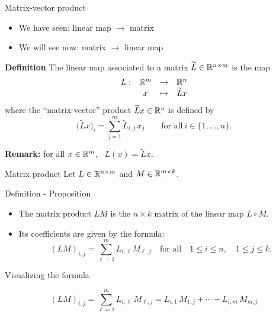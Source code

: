 \documentclass{beamer}
\begin{document}
\begin{frame}[t]{Matrix-vector product}
	\begin{itemize}
		\item We have seen: \quad linear map $\to$ matrix
		\item We will see now: \quad matrix $\to$ linear map
	\end{itemize}

	\begin{block}{\bf Definition}
		The linear map associated to a matrix $\widetilde{L} \in \mathbb{R}^{n \times m}$ is the map
		$$
		\begin{array}{cccc}
			L:& \mathbb{R}^m & \to & \mathbb{R}^n \\
			  & x & \mapsto & \widetilde{L}x
		\end{array}
		$$
		where the ``matrix-vector'' product $\widetilde{L}x \in \mathbb{R}^n$ is defined by
		$$
		\big(\widetilde{L}x\big)_i = \sum_{j=1}^m \widetilde{L}_{i,j} \, x_j \qquad \text{for all} \ i \in \{1, \dots, n\}.
		$$
		\vspace{-0.5cm}
	\end{block}
	\vspace{0.2cm}
	\textbf{Remark:} for all $x\in\mathbb{R}^m$, \ $L(x) = \widetilde{L}x$.
\end{frame}

\begin{frame}[t]{Matrix product}
	Let $L \in \mathbb{R}^{n \times m}$ and $M \in \mathbb{R}^{m \times k}$. 
	\vspace{1.5cm}
	\begin{block}{Definition - Proposition}
		\begin{itemize}
			\item The matrix product $LM$ is the $n \times k$ matrix of the linear map $L \circ M$.
				\vspace{0.1cm}
			\item Its coefficients are given by the formula:
		\vspace{-0.2cm}
				$$
				(LM)_{i,j} = \sum_{\ell=1}^m L_{i,\ell} M_{\ell,j} \quad \text{for all} \quad 1 \leq i \leq n, \quad 1 \leq j \leq k.
				$$
		\end{itemize}
		\vspace{-0.4cm}
	\end{block}
\end{frame}
\begin{frame}[t]{Visualizing the formula}
	\vspace{-0.9cm}
	\begin{exampleblock}{}
		\vspace{-0.4cm}
		$$
		(LM)_{i,j} = \sum_{\ell=1}^m L_{i,\ell} \, M_{\ell,j} 
		= L_{i,1} \, M_{1,j} + \cdots + L_{i,m} \, M_{m,j} 
		$$
		\vspace{-0.3cm}
	\end{exampleblock}
\end{frame}
\end{document}
